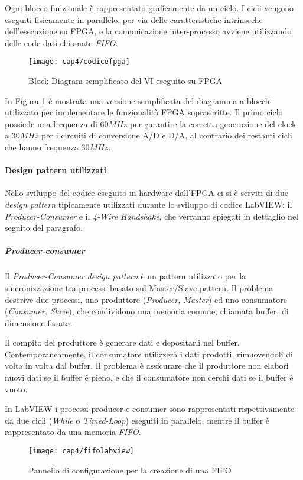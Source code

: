 Ogni blocco funzionale è rappresentato graficamente da un ciclo. I cicli vengono eseguiti fisicamente in parallelo, per via delle caratteristiche intrinseche dell'esecuzione su FPGA, e la comunicazione inter-processo avviene utilizzando delle code dati chiamate \textit{FIFO}. 
\begin{figure}  
  \begin{center}
    \texttt{[image: cap4/codicefpga]}
    \caption{Block Diagram semplificato del VI eseguito su FPGA}
    \label{codicefpga}
  \end{center}
\end{figure}

In Figura \ref{codicefpga} è mostrata una versione semplificata del diagramma a blocchi utilizzato per implementare le funzionalità FPGA soprascritte. Il primo ciclo possiede una frequenza di $60MHz$ per garantire la corretta generazione del clock a $30MHz$ per i circuiti di conversione A/D e D/A, al contrario dei restanti cicli che hanno frequenza $30MHz$.
	
\paragraph{Design pattern utilizzati}
Nello sviluppo del codice eseguito in hardware dall'FPGA ci si è serviti di due \textit{design pattern} tipicamente utilizzati durante lo sviluppo di codice LabVIEW: il \textit{Producer-Consumer} e il \textit{4-Wire Handshake}, che verranno spiegati in dettaglio nel seguito del paragrafo.

\subparagraph{Producer-consumer}
Il \textit{Producer-Consumer design pattern} è un pattern utilizzato per la sincronizzazione tra processi basato sul Master/Slave pattern. Il problema descrive due processi, uno produttore (\textit{Producer, Master}) ed uno consumatore (\textit{Consumer, Slave}), che condividono una memoria comune, chiamata buffer, di dimensione fissata. 

Il compito del produttore è generare dati e depositarli nel buffer. Contemporaneamente, il consumatore utilizzerà i dati prodotti, rimuovendoli di volta in volta dal buffer. Il problema è assicurare che il produttore non elabori nuovi dati se il buffer è pieno, e che il consumatore non cerchi dati se il buffer è vuoto.

In LabVIEW i processi producer e consumer sono rappresentati rispettivamente da due cicli (\textit{While} o \textit{Timed-Loop}) eseguiti in parallelo, mentre il buffer è rappresentato da una memoria \textit{FIFO}. 
\begin{figure}  
  \begin{center}
    \texttt{[image: cap4/fifolabview]}
    \caption{Pannello di configurazione per la creazione di una FIFO}
    \label{fifolabview}
  \end{center}
\end{figure}

